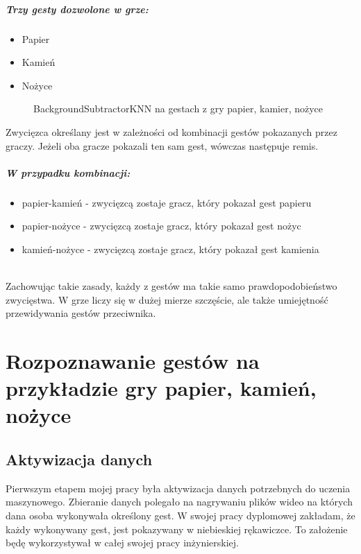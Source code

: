 \documentclass[a4paper,12pt,twoside,openany]{report}
\newcommand{\ImgPath}{.}
\begin{document}
\paragraph{Trzy gesty dozwolone w grze:}
\begin{itemize} 
	\item Papier
	\item Kamień
	\item Nożyce
\end{itemize} 

\begin{figure}[H]
	\centering
	\caption{BackgroundSubtractorKNN na gestach z gry papier, kamier, nożyce}
\end{figure}

Zwycięzca określany jest w zależności od kombinacji gestów pokazanych przez graczy. Jeżeli oba gracze pokazali ten sam gest, wówczas następuje remis. 

\paragraph{W przypadku kombinacji:}
\begin{itemize} 
\item papier-kamień - zwycięzcą zostaje gracz, który pokazał gest papieru
\item papier-nożyce - zwycięzcą zostaje gracz, który pokazał gest nożyc
\item kamień-nożyce - zwycięzcą zostaje gracz, który pokazał gest kamienia
\end{itemize} 
\mbox{} \\	
Zachowując takie zasady, każdy z gestów ma takie samo prawdopodobieństwo zwycięstwa. W grze liczy się w dużej mierze szczęście, ale także umiejętność przewidywania gestów przeciwnika.

\chapter{Rozpoznawanie gestów na przykładzie gry papier, kamień, nożyce}
\section{Aktywizacja danych}
Pierwszym etapem mojej pracy była aktywizacja danych potrzebnych do uczenia maszynowego. Zbieranie danych polegało na nagrywaniu plików wideo na których dana osoba wykonywała określony gest. W swojej pracy dyplomowej zakładam, że każdy wykonywany gest, jest pokazywany w niebieskiej rękawiczce. To założenie będę wykorzystywał w całej swojej pracy inżynierskiej.
\end{document}
